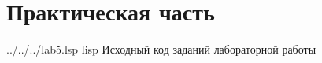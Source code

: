 \chapter*{Практическая часть}

	{../../../lab5.lsp} %
	{lisp} %
	{Исходный код заданий лабораторной работы} %